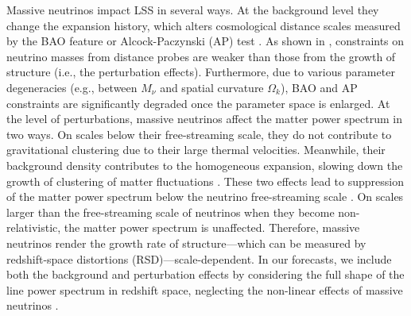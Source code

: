 \documentclass[twocolumn]{aastex631}
\begin{document}
Massive neutrinos impact LSS in several ways. At the background level they change the expansion history, which alters cosmological distance scales measured by the BAO feature or Alcock-Paczynski (AP) test \citep{Zhen:2015yba}. As shown in \cite{Boyle:2017lzt}, constraints on neutrino masses from distance probes are weaker than those from the growth of structure (i.e., the perturbation effects). Furthermore, due to various parameter degeneracies (e.g., between $M_\nu$ and spatial curvature $\Omega_k$), BAO and AP constraints are significantly degraded once the parameter space is enlarged. At the level of perturbations, massive neutrinos affect the matter power spectrum in two ways.  On scales below their free-streaming scale, they do not contribute to gravitational clustering due to their large thermal velocities. Meanwhile, their background density contributes to the homogeneous expansion, slowing down the growth of clustering of matter fluctuations \citep{Bond:1980ha, Hu:1997vi}. These two effects lead to suppression of the matter power spectrum below the neutrino free-streaming scale \citep{Hu:1997mj}. On scales larger than the free-streaming scale of neutrinos when they become non-relativistic, the matter power spectrum is unaffected. Therefore, massive neutrinos render the growth rate of structure---which can be measured by redshift-space distortions (RSD)---scale-dependent. In our forecasts, we include both the background and perturbation effects by considering the full shape of the line power spectrum in redshift space, neglecting the non-linear effects of massive neutrinos  \citep{Brandbyge:2008rv,Bird:2011rb,Castorina:2015bma,Upadhye:2017hdl,Hannestad:2020rzl,Garny:2020rom,Garny:2020ilv,Chen:2020bdf,Bayer:2021kwg}.
\end{document}
